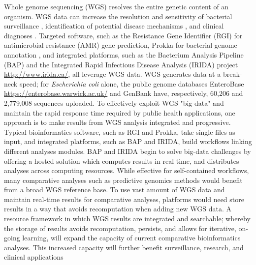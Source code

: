\documentclass[a4,center,fleqn]{NAR}
\begin{document}
Whole genome sequencing (WGS) resolves the entire genetic content of an organism. WGS data can increase the resolution and sensitivity of bacterial surveillance \cite{ronholm2016navigating,lytsy2017time}, identification of potential disease mechanisms \cite{wang2014whole,yuen2015whole}, and clinical diagnoses \cite{willig2015whole,dewey2014clinical}.
Targeted software, such as the Resistance Gene Identifier (RGI) \cite{mcarthur2013comprehensive} for antimicrobial resistance (AMR) gene prediction, Prokka for bacterial genome annotation \cite{doi:10.1093/bioinformatics/btu153}, and integrated platforms, such as the Bacterium Analysis Pipeline (BAP) \cite{thomsen2016bacterial} and the Integrated Rapid Infectious Disease Analysis (IRIDA) project \url{http://www.irida.ca/}, all leverage WGS data.
WGS generates data at a break-neck speed; for \textit{Escherichia coli} alone, the public genome databases EnteroBase \url{https://enterobase.warwick.ac.uk/} and GenBank \cite{doi:10.1093/nar/gks1195} have, respectively, 60,206 and 2,779,008 sequences uploaded.
To effectively exploit WGS "big-data" and maintain the rapid response time required by public health applications, one approach is to make results from WGS analysis integrated and progressive.
Typical bioinformatics software, such as RGI and Prokka, take single files as input, and integrated platforms, such as BAP and IRIDA, build workflows linking different analyses modules.
BAP and IRIDA begin to solve big-data challenges by offering a hosted solution which computes results in real-time, and distributes analyses across computing resources.
While effective for self-contained workflows, many comparative analyses such as predictive genomics methods would benefit from a broad WGS reference base.
To use vast amount of WGS data and maintain real-time results for comparative analyses, platforms would need store results in a way that avoids recomputation when adding new WGS data.
A resource framework in which WGS results are integrated and searchable; whereby the storage of results avoids recomputation, persists, and allows for iterative, on-going learning, will expand the capacity of current comparative bioinformatics analyses.
This increased capacity will further benefit surveillance, research, and clinical applications\par
\end{document}
